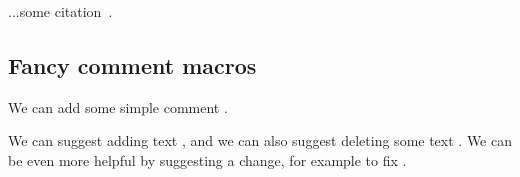 ...some citation~\cite{Warren1890}.

\subsection{Fancy comment macros}

We can add some simple comment .

We can suggest adding text , and we can
also suggest deleting some text . We can be even
more helpful by suggesting a change, for example to fix .
